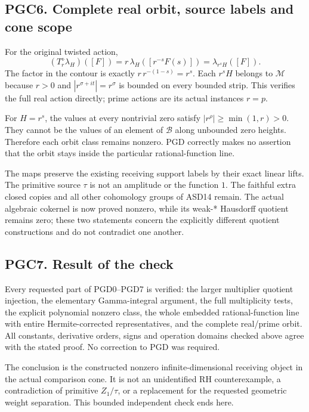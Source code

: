 \subsection{PGC6. Complete real orbit, source labels and cone
scope}\label{pgc6.-complete-real-orbit-source-labels-and-cone-scope}

For the original twisted action, \[
 (T_r^\diamond\lambda_H)([F])
 =r\,\lambda_H([r^{-s}F(s)])
 =\lambda_{r^sH}([F]).
\] The factor in the contour is exactly \(r\,r^{-(1-s)}=r^s\). Each
\(r^sH\) belongs to \(\mathcal M\) because \(r>0\) and
\(|r^{\sigma+it}|=r^\sigma\) is bounded on every bounded strip. This
verifies the full real action directly; prime actions are its actual
instances \(r=p\).

For \(H=r^s\), the values at every nontrivial zero satisfy
\(|r^\rho|\ge\min(1,r)>0\). They cannot be the values of an element of
\(\mathcal B\) along unbounded zero heights. Therefore each orbit class
remains nonzero. PGD correctly makes no assertion that the orbit stays
inside the particular rational-function line.

The maps preserve the existing receiving support labels by their exact
linear lifts. The primitive source \(\tau\) is not an amplitude or the
function \(1\). The faithful extra closed copies and all other
cohomology groups of ASD14 remain. The actual algebraic cokernel is now
proved nonzero, while its weak-* Hausdorff quotient remains zero; these
two statements concern the explicitly different quotient constructions
and do not contradict one another.

\subsection{PGC7. Result of the check}\label{pgc7.-result-of-the-check}

Every requested part of PGD0--PGD7 is verified: the larger multiplier
quotient injection, the elementary Gamma-integral argument, the full
multiplicity tests, the explicit polynomial nonzero class, the whole
embedded rational-function line with entire Hermite-corrected
representatives, and the complete real/prime orbit. All constants,
derivative orders, signs and operation domains checked above agree with
the stated proof. No correction to PGD was required.

The conclusion is the constructed nonzero infinite-dimensional receiving
object in the actual comparison cone. It is not an unidentified RH
counterexample, a contradiction of primitive \(Z_1/\tau\), or a
replacement for the requested geometric weight separation. This bounded
independent check ends here.
